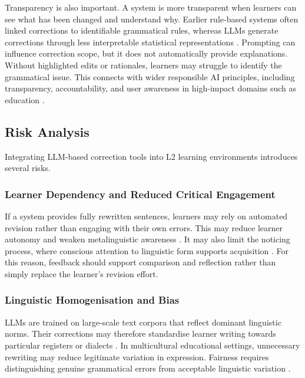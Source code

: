 Transparency is also important. A system is more transparent when learners can see what has been changed and understand why. Earlier rule-based systems often linked corrections to identifiable grammatical rules, whereas LLMs generate corrections through less interpretable statistical representations \cite{NIPS2017_3f5ee243}. Prompting can influence correction scope, but it does not automatically provide explanations. Without highlighted edits or rationales, learners may struggle to identify the grammatical issue. This connects with wider responsible AI principles, including transparency, accountability, and user awareness in high-impact domains such as education \cite{floridi2018ai4people}.

\subsection{Risk Analysis}

Integrating LLM-based correction tools into L2 learning environments introduces several risks.

\subsubsection{Learner Dependency and Reduced Critical Engagement}

If a system provides fully rewritten sentences, learners may rely on automated revision rather than engaging with their own errors. This may reduce learner autonomy and weaken metalinguistic awareness \cite{ke2019automated}. It may also limit the noticing process, where conscious attention to linguistic form supports acquisition \cite{schmidt1990role}. For this reason, feedback should support comparison and reflection rather than simply replace the learner's revision effort.

\subsubsection{Linguistic Homogenisation and Bias}

LLMs are trained on large-scale text corpora that reflect dominant linguistic norms. Their corrections may therefore standardise learner writing towards particular registers or dialects \cite{NEURIPS2020_1457c0d6}. In multicultural educational settings, unnecessary rewriting may reduce legitimate variation in expression. Fairness requires distinguishing genuine grammatical errors from acceptable linguistic variation \cite{floridi2018ai4people}.

